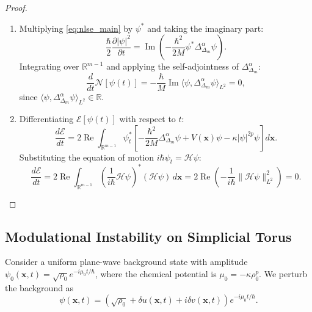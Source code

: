 \documentclass[11pt,a4paper]{article}
\theoremstyle{plain}
\theoremstyle{definition}
\theoremstyle{remark}
\numberwithin{equation}{section}
\begin{document}
\begin{proof}
\leavevmode
\begin{enumerate}
    \item Multiplying \eqref{eq:nlse_main} by $\psi^*$ and taking the imaginary part:
    \begin{equation}
    \frac{\hbar}{2}\frac{\partial |\psi|^2}{\partial t} = \operatorname{Im}\left(-\frac{\hbar^2}{2M}\psi^* \Delta_{\Delta_m}^\alpha \psi\right).
    \end{equation}
    Integrating over $\mathbb{R}^{m-1}$ and applying the self-adjointness of $\Delta_{\Delta_m}^\alpha$:
    \begin{equation}
    \frac{d}{dt}\mathcal{N}[\psi(t)] = -\frac{\hbar}{M}\operatorname{Im}\langle \psi, \Delta_{\Delta_m}^\alpha \psi \rangle_{L^2} = 0,
    \end{equation}
    since $\langle \psi, \Delta_{\Delta_m}^\alpha \psi \rangle_{L^2} \in \mathbb{R}$.
    
    \item Differentiating $\mathcal{E}[\psi(t)]$ with respect to $t$:
    \begin{equation}
    \frac{d\mathcal{E}}{dt} = 2\operatorname{Re}\int_{\mathbb{R}^{m-1}} \psi_t^* \left[ -\frac{\hbar^2}{2M}\Delta_{\Delta_m}^\alpha \psi + V(\mathbf{x})\psi - \kappa |\psi|^{2p}\psi \right] d\mathbf{x}.
    \end{equation}
    Substituting the equation of motion $i\hbar \psi_t = \mathcal{H}\psi$:
    \begin{equation}
    \frac{d\mathcal{E}}{dt} = 2\operatorname{Re}\int_{\mathbb{R}^{m-1}} \left(\frac{1}{i\hbar}\mathcal{H}\psi\right)^* (\mathcal{H}\psi) \, d\mathbf{x} = 2\operatorname{Re}\left(-\frac{1}{i\hbar}\|\mathcal{H}\psi\|_{L^2}^2\right) = 0.
    \end{equation}
\end{enumerate}
\end{proof}

\subsection{Modulational Instability on Simplicial Torus}

Consider a uniform plane-wave background state with amplitude $\psi_0(\mathbf{x}, t) = \sqrt{\rho_0} e^{-i \mu_0 t / \hbar}$, where the chemical potential is $\mu_0 = -\kappa \rho_0^p$. We perturb the background as
\begin{equation}
\psi(\mathbf{x}, t) = \left(\sqrt{\rho_0} + \delta u(\mathbf{x}, t) + i \delta v(\mathbf{x}, t)\right) e^{-i \mu_0 t / \hbar}.
\end{equation}
\end{document}
